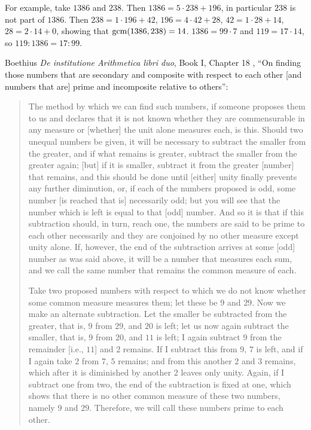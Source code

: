 \documentclass{article}
\newcommand{\gcm}{\ensuremath\mathrm{gcm}}
\begin{document}
For example, take $1386$ and $238$. 
Then $1386=5\cdot 238 + 196$, in particular $238$ is not part of $1386$.
Then $238=1\cdot 196+42$, $196=4\cdot 42+28$, $42=1\cdot 28+14$, $28=2\cdot 14+0$, showing
that $\gcm(1386,238)=14$. $1386=  99 \cdot 7$ and $119=17\cdot 14$, so
$119:1386 = 17:99$. 
 


Boethius {\em De institutione Arithmetica libri duo}, Book I, Chapter 18 \cite[pp.~21--22, \S 2]{grant1974}, ``On finding those numbers that are secondary
and composite with respect to each other [and numbers that are] prime and incomposite relative to others'':

\begin{quote}
The method by which we can find such numbers, if someone proposes them to us and declares that it is not known whether they are commensurable
in any measure or [whether] the unit alone measures each, is this. Should two unequal numbers be given, it will be necessary to subtract the smaller from the greater,
and if what remains is greater, subtract the smaller from the greater again; [but] if it is smaller, subtract it from the greater [number] that remains, and this should be done
until [either] unity finally prevents any further diminution, or, if each of the numbers proposed is odd, some number [is reached that is] necessarily odd; but you will see that
the number which is left is equal to that [odd] number. And so it is that if this subtraction should, in turn, reach one, the numbers are said to be prime to each
other necessarily and they are conjoined by no other measure except unity alone. If, however, the end of the subtraction arrives at some [odd] number as was said above, it will
be a number that measures each sum, and we call the same number that remains the common measure of each.

Take two proposed numbers with respect to which we do not know whether some common measure measures them; let these be $9$ and $29$. Now we make
an alternate subtraction. Let the smaller be subtracted from the greater, that is, $9$ from $29$, and $20$ is left; let us now again subtract
the smaller, that is, $9$ from $20$, and $11$ is left; I again subtract $9$ from the remainder [i.e., $11$] and  $2$ remains. If I subtract this from $9$, $7$ is left, and if I again
take $2$ from $7$, $5$ remains; and from this another $2$ and $3$ remains, which after it is diminished by another $2$ leaves only unity. Again, if I subtract one from two, the end of the subtraction is fixed at one, which shows that there is no other common measure of these two numbers, namely $9$ and $29$. Therefore, we will
call these numbers prime to each other.


\end{quote}
\end{document}
